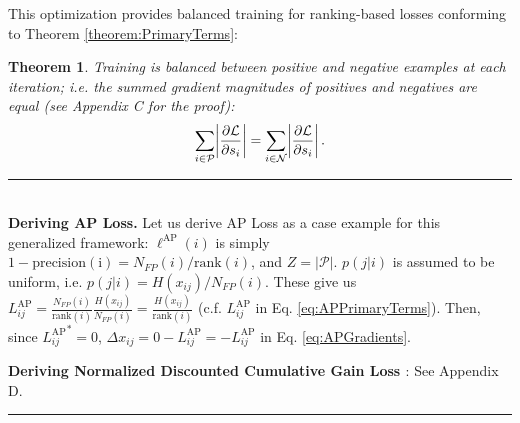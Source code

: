 \documentclass{article}
\newtheorem{theorem}{Theorem}
\begin{document}
This optimization provides balanced training for  ranking-based losses conforming to Theorem \ref{theorem:PrimaryTerms}:
\begin{theorem} 
\label{theorem:BalancedTraining}
Training is balanced between positive and negative examples at each iteration; i.e. the summed gradient magnitudes of positives and negatives are equal (see Appendix C for the proof):
\begin{align}
\label{eq:Theorem1}
\sum \limits_{i \in \mathcal{P}} \abs{\frac{\partial \mathcal{L}}{\partial s_i}} = \sum \limits_{i \in \mathcal{N}} \abs{\frac{\partial \mathcal{L}}{\partial s_i}}.
\end{align}
\end{theorem}
\textcolor{blue}{\rule{\textwidth}{0.1mm}}\\
\textbf{Deriving AP Loss.} Let us derive AP Loss as a case example for this generalized framework: $\ell^{\mathrm{AP}}(i)$ is simply $1-\mathrm{precision(i)}=N_{FP}(i) /\mathrm{rank}(i)$, and $Z=|\mathcal{P}|$. $p(j|i)$ is assumed to be uniform, i.e. $p(j|i)=H(x_{ij})/N_{FP}(i)$. These give us $L_{ij}^{\mathrm{AP}}=\frac{N_{FP}(i) }{\mathrm{rank}(i)} \frac{H(x_{ij})}{N_{FP}(i)}= \frac{H(x_{ij})}{\mathrm{rank}(i)}$ (c.f. $L_{ij}^{\mathrm{AP}}$ in Eq. \eqref{eq:APPrimaryTerms}). Then, since ${L_{ij}^{\mathrm{AP}}}^*=0$, $\Delta x_{ij}=0-L^{\mathrm{AP}}_{ij}=-L^{\mathrm{AP}}_{ij}$ in Eq. \eqref{eq:APGradients}.

\textbf{Deriving Normalized Discounted Cumulative Gain Loss \cite{OptimizingUpperBound}}: See Appendix D.\\
\textcolor{blue}{\rule{\textwidth}{0.1mm}}
\end{document}
